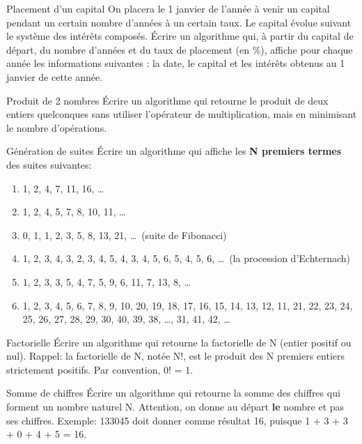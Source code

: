 \begin{Exercice}{Placement d'un capital}
	On placera le 1 janvier de l’année à venir un
	capital pendant un certain nombre d’années à un certain taux. Le
	capital évolue suivant le système des intérêts composés. Écrire un
	algorithme qui, à partir du capital de départ, du nombre d’années et du
	taux de placement (en \%), affiche pour chaque année les informations
	suivantes : la date, le capital et les intérêts obtenus au
	1 janvier de cette année.
\end{Exercice}

\begin{Exercice}{Produit de 2 nombres}
	Écrire un algorithme qui retourne le produit de deux entiers quelconques
	sans utiliser l’opérateur de multiplication, mais en minimisant le
	nombre d’opérations.
\end{Exercice}

\begin{Exercice}{Génération de suites}
	Écrire un algorithme qui affiche les \textbf{N premiers termes} des
	suites suivantes:

	\begin{enumerate}[label=\alph*)]
	\item {
	1, 2, 4, 7, 11, 16, \dots}
	\item {
	1, 2, 4, 5, 7, 8, 10, 11, \dots}
	\item {
	0, 1, 1, 2, 3, 5, 8, 13, 21, \dots\ (suite de Fibonacci)}
	\item {
	1, 2, 3, 4, 3, 2, 3, 4, 5, 4, 3, 4, 5, 6, 5, 4, 5, 6, \dots\ 
	(la procession d'Echternach)}
	\item {
	1, 2, 3, 3, 5, 4, 7, 5, 9, 6, 11, 7, 13, 8, \dots }
	\item {
	1, 2, 3, 4, 5, 6, 7, 8, 9, 10, 20, 19, 18, 17, 16, 15, 14, 13, 12, 11,
	21, 22, 23, 24, 25, 26, 27, 28, 29, 30, 40, 39, 38, \dots, 31, 41, 42, \dots}
	\end{enumerate}
\end{Exercice}

\begin{Exercice}{Factorielle}
	Écrire un algorithme qui retourne la factorielle de N (entier positif ou
	nul). Rappel: la factorielle de N, notée N!, est le produit des N
	premiers entiers strictement positifs. Par convention, 0! = 1.
\end{Exercice}

\begin{Exercice}{Somme de chiffres}
	Écrire un algorithme qui retourne la somme des chiffres qui forment un
	nombre naturel N. Attention, on donne au départ \textbf{le} nombre et
	pas ses chiffres. Exemple: 133045 doit donner comme résultat 16,
	puisque 1 + 3 + 3 + 0 + 4 + 5 = 16.
\end{Exercice}

